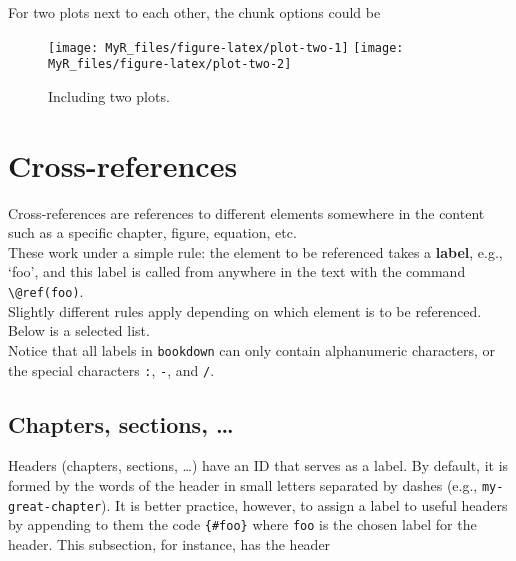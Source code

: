 \documentclass[]{book}
\newenvironment{Shaded}{}{}
\newcommand{\BaseNTok}[1]{\textcolor[rgb]{0.25,0.63,0.44}{#1}}
\theoremstyle{definition}
\theoremstyle{definition}
\theoremstyle{definition}
\theoremstyle{remark}
\begin{document}
For two plots next to each other, the chunk options could be

\begin{Shaded}
\end{Shaded}

\begin{figure}

{\centering \texttt{[image: MyR\_files/figure-latex/plot-two-1]} \texttt{[image: MyR\_files/figure-latex/plot-two-2]} 

}

\caption{Including two plots.}\label{fig:plot-two}
\end{figure}

\hypertarget{cr}{%
\section{Cross-references}\label{cr}}

Cross-references are references to different elements somewhere in the
content such as a specific chapter, figure, equation, etc.\\
These work under a simple rule: the element to be referenced takes a
\textbf{label}, e.g., `foo', and this label is called from anywhere in
the text with the command \texttt{\textbackslash{}@ref(foo)}.\\
Slightly different rules apply depending on which element is to be
referenced. Below is a selected list.\\
Notice that all labels in \texttt{bookdown} can only contain
alphanumeric characters, or the special characters \texttt{:},
\texttt{-}, and \texttt{/}.

\hypertarget{cr-chapters}{%
\subsection{Chapters, sections, \ldots{}}\label{cr-chapters}}

Headers (chapters, sections, \ldots) have an ID that serves as a label.
By default, it is formed by the words of the header in small letters
separated by dashes (e.g., \texttt{my-great-chapter}). It is better
practice, however, to assign a label to useful headers by appending to
them the code \texttt{\{\#foo\}} where \texttt{foo} is the chosen label
for the header. This subsection, for instance, has the header
\end{document}

